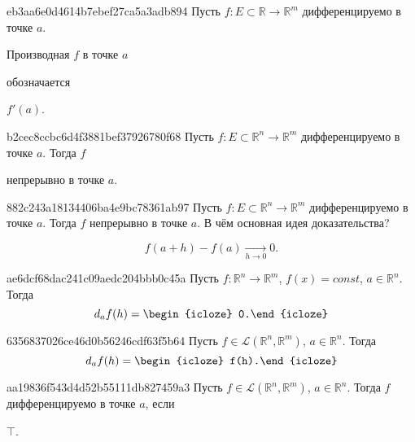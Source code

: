 \begin{note}{eb3aa6e0d4614b7ebef27ca5a3adb894}
    Пусть \({ f : E \subset \mathbb R \to \mathbb R^{m} }\) дифференцируемо в точке \({ a }\).
    \begin{icloze}{2}Производная \({ f }\) в точке \({ a }\)\end{icloze} обозначается \begin{icloze}{1}\({ f'(a) }\).\end{icloze}
\end{note}

\begin{note}{b2cec8ccbc6d4f3881bef37926780f68}
    Пусть \({ f : E \subset \mathbb R^{n} \to \mathbb R^{m} }\) дифференцируемо в точке \({ a }\).
    Тогда \({ f }\) \begin{icloze}{1}непрерывно в точке \({ a }\).\end{icloze}
\end{note}

\begin{note}{882c243a18134406ba4e9bc78361ab97}
    Пусть \({ f : E \subset \mathbb R^{n} \to \mathbb R^{m} }\) дифференцируемо в точке \({ a }\).
    Тогда \({ f }\) непрерывно в точке \({ a }\).
    В чём основная идея доказательства?

    \begin{cloze}{1}
        \[
            f(a + h) - f(a) \underset{h \to 0}\longrightarrow 0.
        \]
    \end{cloze}
\end{note}

\begin{note}{ae6dcf68dac241c09aedc204bbb0c45a}
    Пусть \({ f : \mathbb R^{n} \to \mathbb R^{m} }\),\: \({ f(x) = const }\),\: \({ a \in \mathbb R^{n} }\).
    Тогда
    \[
        d_{a} f(h) = \begin{icloze}{1}0.\end{icloze}
    \]
\end{note}

\begin{note}{6356837026ce46d0b56246cdf63f5b64}
    Пусть \({ f \in \mathcal L(\mathbb R^{n}, \mathbb R^{m}) }\),\: \({ a \in \mathbb R^{n} }\).
    Тогда
    \[
        d_{a} f(h) = \begin{icloze}{1}f(h).\end{icloze}
    \]
\end{note}

\begin{note}{aa19836f543d4d52b55111db827459a3}
    Пусть \({ f \in \mathcal L(\mathbb R^{n}, \mathbb R^{m}) }\),\: \({ a \in \mathbb R^{n} }\).
    Тогда \({ f }\) дифференцируемо в точке \({ a }\), если \begin{icloze}{1}\({ \top }\).\end{icloze}
\end{note}

